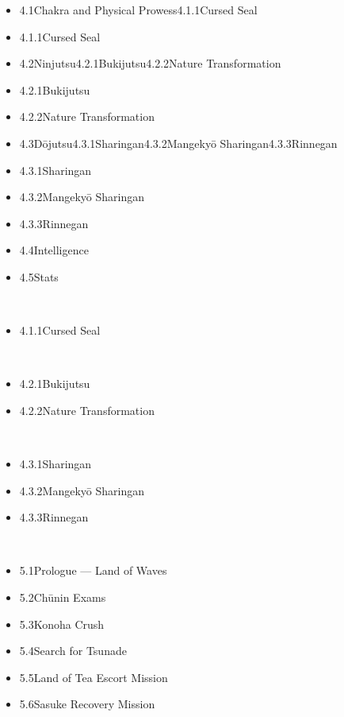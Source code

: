 \documentclass[a4paper,12pt]{article}
\begin{document}
\begin{itemize}
\item 4.1Chakra and Physical Prowess4.1.1Cursed Seal
\item 4.1.1Cursed Seal
\item 4.2Ninjutsu4.2.1Bukijutsu4.2.2Nature Transformation
\item 4.2.1Bukijutsu
\item 4.2.2Nature Transformation
\item 4.3Dōjutsu4.3.1Sharingan4.3.2Mangekyō Sharingan4.3.3Rinnegan
\item 4.3.1Sharingan
\item 4.3.2Mangekyō Sharingan
\item 4.3.3Rinnegan
\item 4.4Intelligence
\item 4.5Stats
\end{itemize}\\ \par \vspace{0.5cm}

\begin{itemize}
\item 4.1.1Cursed Seal
\end{itemize}\\ \par \vspace{0.5cm}

\begin{itemize}
\item 4.2.1Bukijutsu
\item 4.2.2Nature Transformation
\end{itemize}\\ \par \vspace{0.5cm}

\begin{itemize}
\item 4.3.1Sharingan
\item 4.3.2Mangekyō Sharingan
\item 4.3.3Rinnegan
\end{itemize}\\ \par \vspace{0.5cm}

\begin{itemize}
\item 5.1Prologue — Land of Waves
\item 5.2Chūnin Exams
\item 5.3Konoha Crush
\item 5.4Search for Tsunade
\item 5.5Land of Tea Escort Mission
\item 5.6Sasuke Recovery Mission
\end{itemize}\\ \par \vspace{0.5cm}
\end{document}
